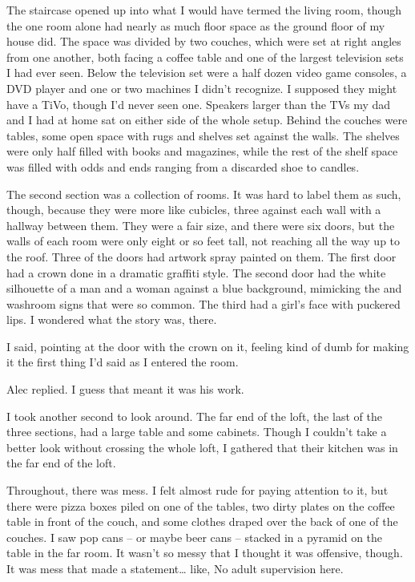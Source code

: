 The staircase opened up into what I would have termed the living room, though the one room alone had nearly as much floor space as the ground floor of my house did. The space was divided by two couches, which were set at right angles from one another, both facing a coffee table and one of the largest television sets I had ever seen. Below the television set were a half dozen video game consoles, a DVD player and one or two machines I didn't recognize. I supposed they might have a TiVo, though I'd never seen one. Speakers larger than the TVs my dad and I had at home sat on either side of the whole setup. Behind the couches were tables, some open space with rugs and shelves set against the walls. The shelves were only half filled with books and magazines, while the rest of the shelf space was filled with odds and ends ranging from a discarded shoe to candles.

The second section was a collection of rooms. It was hard to label them as such, though, because they were more like cubicles, three against each wall with a hallway between them. They were a fair size, and there were six doors, but the walls of each room were only eight or so feet tall, not reaching all the way up to the roof. Three of the doors had artwork spray painted on them. The first door had a crown done in a dramatic graffiti style. The second door had the white silhouette of a man and a woman against a blue background, mimicking the  and  washroom signs that were so common. The third had a girl's face with puckered lips. I wondered what the story was, there.

 I said, pointing at the door with the crown on it, feeling kind of dumb for making it the first thing I'd said as I entered the room.

 Alec replied. I guess that meant it was his work.

I took another second to look around. The far end of the loft, the last of the three sections, had a large table and some cabinets. Though I couldn't take a better look without crossing the whole loft, I gathered that their kitchen was in the far end of the loft.

Throughout, there was mess. I felt almost rude for paying attention to it, but there were pizza boxes piled on one of the tables, two dirty plates on the coffee table in front of the couch, and some clothes draped over the back of one of the couches. I saw pop cans -- or maybe beer cans -- stacked in a pyramid on the table in the far room. It wasn't so messy that I thought it was offensive, though. It was mess that made a statement\ldots{} like,  No adult supervision here.

